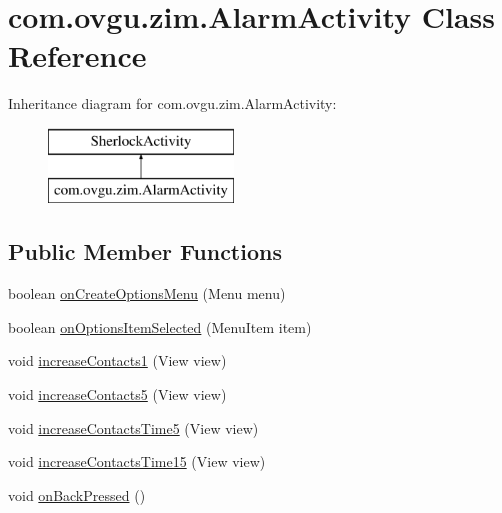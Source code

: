 \hypertarget{classcom_1_1ovgu_1_1zim_1_1_alarm_activity}{\section{com.\-ovgu.\-zim.\-Alarm\-Activity Class Reference}
\label{classcom_1_1ovgu_1_1zim_1_1_alarm_activity}
}
Inheritance diagram for com.\-ovgu.\-zim.\-Alarm\-Activity\-:\begin{figure}[H]
\begin{center}
\leavevmode
\includegraphics[height=2.000000cm]{classcom_1_1ovgu_1_1zim_1_1_alarm_activity}
\end{center}
\end{figure}
\subsection*{Public Member Functions}
\begin{DoxyCompactItemize}
\item 
boolean \hyperlink{classcom_1_1ovgu_1_1zim_1_1_alarm_activity_a63b6db1ec9db5d4ebc2c73f50d7765cc}{on\-Create\-Options\-Menu} (Menu menu)
\item 
boolean \hyperlink{classcom_1_1ovgu_1_1zim_1_1_alarm_activity_a9636854565b6b5b656b54c129cc25b34}{on\-Options\-Item\-Selected} (Menu\-Item item)
\item 
void \hyperlink{classcom_1_1ovgu_1_1zim_1_1_alarm_activity_a3a5a0f72583d64b2bab175fa7f720e05}{increase\-Contacts1} (View view)
\item 
void \hyperlink{classcom_1_1ovgu_1_1zim_1_1_alarm_activity_ab3fa863a3d90cc3d0ed4944cd3dde0f0}{increase\-Contacts5} (View view)
\item 
void \hyperlink{classcom_1_1ovgu_1_1zim_1_1_alarm_activity_af17eed75579abd860125532d3724d1ff}{increase\-Contacts\-Time5} (View view)
\item 
void \hyperlink{classcom_1_1ovgu_1_1zim_1_1_alarm_activity_ad9a76a33b154f40a5f0086a4ea511b7e}{increase\-Contacts\-Time15} (View view)
\item 
void \hyperlink{classcom_1_1ovgu_1_1zim_1_1_alarm_activity_a235a2bff840877b8fae3d824c7bf437c}{on\-Back\-Pressed} ()
\end{DoxyCompactItemize}
